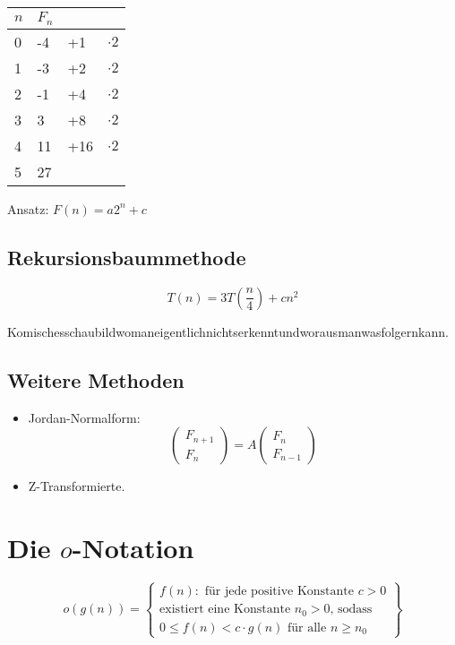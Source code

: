 \documentclass[a4paper,twoside,DIV15,BCOR12mm]{scrbook}
\begin{document}
\begin{tabular}{llll}
$n$ & $F_n$ \\
\hline
0 & -4 & +1  & $\cdot2$ \\
1 & -3 & +2 & $\cdot2$\\
2 & -1 & +4 & $\cdot2$\\
3 & 3 &+8 & $\cdot2$ \\
4 & 11 & +16 & $\cdot2$\\
5 & 27 & 
\end{tabular}

Ansatz: $F(n) = a2^n+c$

\subsection{Rekursionsbaummethode}

$$T(n) = 3 T \left(\frac{n}{4}\right) + cn^2 $$

Komischesschaubildwomaneigentlichnichtserkenntundworausmanwasfolgernkann.

\subsection{Weitere Methoden}
\begin{itemize}
\item Jordan-Normalform: $$\begin{pmatrix}F_{n+1} \\ F_{n}\end{pmatrix} = A\begin{pmatrix}F_n\\F_{n-1}\end{pmatrix}$$
\item Z-Transformierte.
\end{itemize}


\section{Die $o$-Notation}

$$o(g(n)) = \left\{ 
\begin{array}{l}
	f(n) : \text{ für jede positive Konstante }c>0  \\
	\text{existiert eine Konstante $n_0>0$, sodass }\\
	0\leq f(n) < c \cdot g(n) \text{ für alle } n \geq n_0
\end{array} \right\}$$
\end{document}
